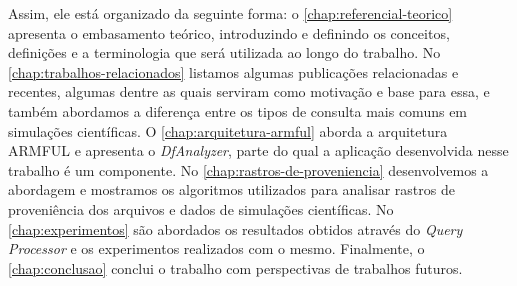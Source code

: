 Assim, ele está organizado da seguinte forma:
o \autoref{chap:referencial-teorico} apresenta o embasamento teórico, introduzindo e definindo os conceitos, definições e a terminologia que será utilizada ao longo do trabalho.
No \autoref{chap:trabalhos-relacionados} listamos algumas publicações relacionadas e recentes, algumas dentre as quais serviram como motivação e base para essa, e também abordamos a diferença entre os tipos de consulta mais comuns em simulações científicas.
O \autoref{chap:arquitetura-armful} aborda a arquitetura ARMFUL e apresenta o \textit{DfAnalyzer}, parte do qual a aplicação desenvolvida nesse trabalho é um componente.
No \autoref{chap:rastros-de-proveniencia} desenvolvemos a abordagem e mostramos os algoritmos utilizados para analisar rastros de proveniência dos arquivos e dados de simulações científicas.
No \autoref{chap:experimentos} são abordados os resultados obtidos através do \textit{Query Processor} e os experimentos realizados com o mesmo.
Finalmente, o \autoref{chap:conclusao} conclui o trabalho com perspectivas de trabalhos futuros.
